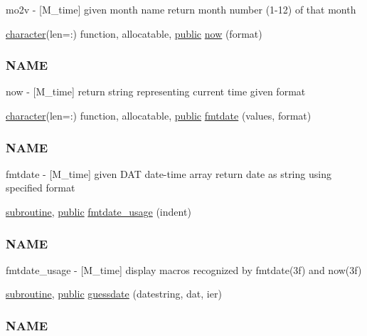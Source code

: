 \begin{DoxyCompactItemize}
\begin{DoxyCompactList}
mo2v -\/ \mbox{[}M\+\_\+time\mbox{]} given month name return month number (1-\/12) of that month \end{DoxyCompactList}\item 
\hyperlink{option__stopwatch_83_8txt_abd4b21fbbd175834027b5224bfe97e66}{character}(len=\+:) function, allocatable, \hyperlink{M__stopwatch_83_8txt_a2f74811300c361e53b430611a7d1769f}{public} \hyperlink{namespacem__time_a6b5e87be0e510ff268c1ecfbf67a3bdb}{now} (format)
\begin{DoxyCompactList}\small\item\em \subsubsection*{N\+A\+ME}

now -\/ \mbox{[}M\+\_\+time\mbox{]} return string representing current time given format \end{DoxyCompactList}\item 
\hyperlink{option__stopwatch_83_8txt_abd4b21fbbd175834027b5224bfe97e66}{character}(len=\+:) function, allocatable, \hyperlink{M__stopwatch_83_8txt_a2f74811300c361e53b430611a7d1769f}{public} \hyperlink{namespacem__time_a2cb84c9b8af4f395b76aed76e1431328}{fmtdate} (values, format)
\begin{DoxyCompactList}\small\item\em \subsubsection*{N\+A\+ME}

fmtdate -\/ \mbox{[}M\+\_\+time\mbox{]} given D\+AT date-\/time array return date as string using specified format \end{DoxyCompactList}\item 
\hyperlink{M__stopwatch_83_8txt_acfbcff50169d691ff02d4a123ed70482}{subroutine}, \hyperlink{M__stopwatch_83_8txt_a2f74811300c361e53b430611a7d1769f}{public} \hyperlink{namespacem__time_a914927f70fb9495af1be2e484b967111}{fmtdate\+\_\+usage} (indent)
\begin{DoxyCompactList}\small\item\em \subsubsection*{N\+A\+ME}

fmtdate\+\_\+usage -\/ \mbox{[}M\+\_\+time\mbox{]} display macros recognized by fmtdate(3f) and now(3f) \end{DoxyCompactList}\item 
\hyperlink{M__stopwatch_83_8txt_acfbcff50169d691ff02d4a123ed70482}{subroutine}, \hyperlink{M__stopwatch_83_8txt_a2f74811300c361e53b430611a7d1769f}{public} \hyperlink{namespacem__time_aa5198c7aa4f3d8411c8ce93046ce3794}{guessdate} (datestring, dat, ier)
\begin{DoxyCompactList}\small\item\em \subsubsection*{N\+A\+ME}


\end{DoxyCompactList}
\end{DoxyCompactItemize}
